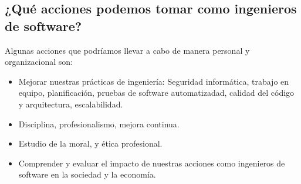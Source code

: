 \documentclass[twoside]{article}
\begin{document}
\begin{multicols}{2}
\begin{itemize}
\end{itemize}

\subsection{¿Qué acciones podemos tomar como ingenieros de software?}

Algunas acciones que podríamos llevar a cabo de manera personal y organizacional
son:

\begin{itemize}
\item Mejorar nuestras prácticas de ingeniería: Seguridad informática, trabajo
en equipo, planificación, pruebas de software automatizadad, calidad del código
y arquitectura, escalabilidad.
\item Disciplina, profesionalismo, mejora continua.
\item Estudio de la moral, y ética profesional.
\item Comprender y evaluar el impacto de nuestras acciones como ingenieros de
software en la sociedad y la economía.
\end{itemize}

\pagebreak
 


\end{multicols}
\end{document}
